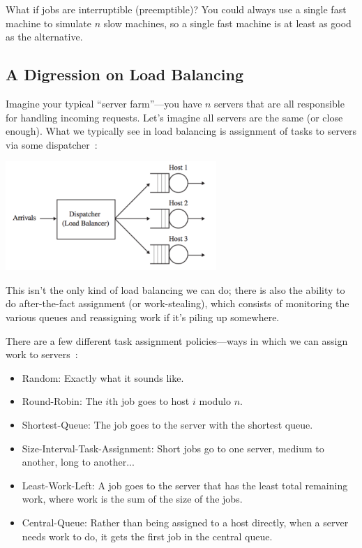 \documentclass[a4paper]{report}
\begin{document}
What if jobs are interruptible (preemptible)? You could always use a single fast machine to simulate $n$ slow machines, so a single fast machine is at least as good as the alternative. 

\subsection*{A Digression on Load Balancing}

Imagine your typical ``server farm''---you have $n$ servers that are all responsible for handling incoming requests. Let's imagine all servers are the same (or close enough). What we typically see in load balancing is assignment of tasks to servers via some dispatcher~\cite{pmd}:

\begin{center}
	\includegraphics[width=0.6\textwidth]{images/central-dispatcher.png}
\end{center}

This isn't the only kind of load balancing we can do; there is also the ability to do after-the-fact assignment (or work-stealing), which consists of monitoring the various queues and reassigning work if it's piling up somewhere.

There are a few different task assignment policies---ways in which we can assign work to servers~\cite{pmd}:

\begin{itemize}
	\item Random: Exactly what it sounds like.
	\item Round-Robin: The $i$th job goes to host $i$ modulo $n$.
	\item Shortest-Queue: The job goes to the server with the shortest queue.
	\item Size-Interval-Task-Assignment: Short jobs go to one server, medium to another, long to another...
	\item Least-Work-Left: A job goes to the server that has the least total remaining work, where work is the sum of the size of the jobs.
	\item Central-Queue: Rather than being assigned to a host directly, when a server needs work to do, it gets the first job in the central queue.
\end{itemize}
\end{document}
